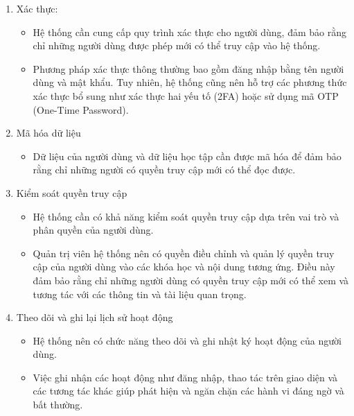 \documentclass[../Thesis.tex]{subfiles}
\begin{document}
            \begin{enumerate}
                \item Xác thực:
                    \begin{itemize}[label=$\bullet$]
                        \item Hệ thống cần cung cấp quy trình xác thực cho người dùng, đảm bảo rằng chỉ những người dùng được phép mới có thể truy cập vào hệ thống.
                        \item Phương pháp xác thực thông thường bao gồm đăng nhập bằng tên người dùng và mật khẩu. Tuy nhiên, hệ thống cũng nên hỗ trợ các phương thức xác thực bổ sung như xác thực hai yếu tố (2FA) hoặc sử dụng mã OTP (One-Time Password).
                    \end{itemize}

                \item Mã hóa dữ liệu
                    \begin{itemize}[label=$\bullet$]
                        \item Dữ liệu của người dùng và dữ liệu học tập cần được mã hóa để đảm bảo rằng chỉ những người có quyền truy cập mới có thể đọc được.
                    \end{itemize}

                \item Kiểm soát quyền truy cập
                \begin{itemize}[label=$\bullet$]
                    \item Hệ thống cần có khả năng kiểm soát quyền truy cập dựa trên vai trò và phân quyền của người dùng.
                    
                    \item Quản trị viên hệ thống nên có quyền điều chỉnh và quản lý quyền truy cập của người dùng vào các khóa học và nội dung tương ứng. Điều này đảm bảo rằng chỉ những người dùng có quyền truy cập mới có thể xem và tương tác với các thông tin và tài liệu quan trọng.
                \end{itemize}

                \item Theo dõi và ghi lại lịch sử hoạt động
                \begin{itemize}[label=$\bullet$]
                    \item Hệ thống nên có chức năng theo dõi và ghi nhật ký hoạt động của người dùng.
                    
                    \item Việc ghi nhận các hoạt động như đăng nhập, thao tác trên giao diện và các tương tác khác giúp phát hiện và ngăn chặn các hành vi đáng ngờ và bất thường.
                \end{itemize}
            \end{enumerate}
\end{document}
